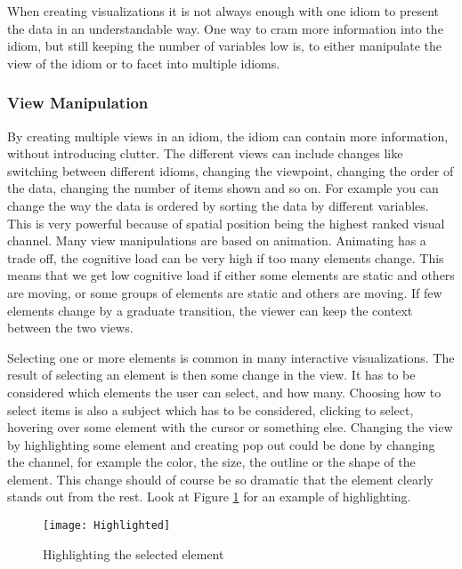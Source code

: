 \documentclass[Report.tex]{subfiles}
\begin{document}
When creating visualizations it is not always enough with one idiom to present the data in an understandable way. One way to cram more information into the idiom, but still keeping the number of variables low is, to either manipulate the view of the idiom or to facet into multiple idioms. 
\subsubsection{View Manipulation}
By creating multiple views in an idiom, the idiom can contain more information, without introducing clutter. The different views can include changes like switching between different idioms, changing the viewpoint, changing the order of the data, changing the number of items shown and so on. For example you can change the way the data is ordered by sorting the data by different variables. This is very powerful because of spatial position being the highest ranked visual channel. Many view manipulations are based on animation. Animating has a trade off, the cognitive load can be very high if too many elements change. This means that we get low cognitive load if either some elements are static and others are moving, or some groups of elements are static and others are moving. If few elements change by a graduate transition, the viewer can keep the context between the two views. \cite[Chapter 11]{Tamara}

Selecting one or more elements is common in many interactive visualizations. The result of selecting an element is then some change in the view. It has to be considered which elements the user can select, and how many. Choosing how to select items is also a subject which has to be considered, clicking to select, hovering over some element with the cursor or something else. 
Changing the view by highlighting some element and creating pop out could be done by changing the channel, for example the color, the size, the outline or the shape of the element. This change should of course be so dramatic that the element clearly stands out from the rest. Look at Figure \ref{fig:highlighted} for an example of highlighting. \cite[Chapter 11]{Tamara}
\begin{figure}
\center
\texttt{[image: Highlighted]}
\caption{Highlighting the selected element}
\label{fig:highlighted}
\end{figure}
\end{document}
